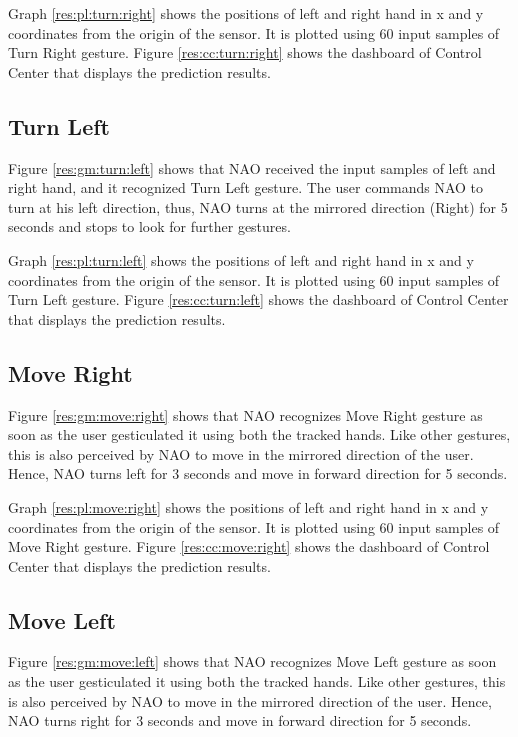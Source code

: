 

Graph \ref{res:pl:turn:right} shows the positions of left and right hand in x and y coordinates from the origin of the sensor. It is plotted using 60 input samples of Turn Right gesture. Figure \ref{res:cc:turn:right} shows the dashboard of Control Center that displays the prediction results. 

\clearpage
\subsection{Turn Left}
 Figure \ref{res:gm:turn:left} shows that NAO received the input samples of left and right hand, and it recognized Turn Left gesture. The user commands NAO to turn at his left direction, thus, NAO turns at the mirrored direction (Right) for 5 seconds and stops to look for further gestures.
 


Graph \ref{res:pl:turn:left} shows the positions of left and right hand in x and y coordinates from the origin of the sensor. It is plotted using 60 input samples of Turn Left gesture. Figure \ref{res:cc:turn:left} shows the dashboard of Control Center that displays the prediction results. 

\clearpage
\subsection{Move Right} 
Figure \ref{res:gm:move:right} shows that NAO recognizes Move Right gesture as soon as the user gesticulated it using both the tracked hands. Like other gestures, this is also perceived by NAO to move in the mirrored direction of the user. Hence, NAO turns left for 3 seconds and move in forward direction for 5 seconds.



Graph \ref{res:pl:move:right} shows the positions of left and right hand in x and y coordinates from the origin of the sensor. It is plotted using 60 input samples of Move Right gesture. Figure \ref{res:cc:move:right} shows the dashboard of Control Center that displays the prediction results. 

\clearpage
\subsection{Move Left}
Figure \ref{res:gm:move:left} shows that NAO recognizes Move Left gesture as soon as the user gesticulated it using both the tracked hands. Like other gestures, this is also perceived by NAO to move in the mirrored direction of the user. Hence, NAO turns right for 3 seconds and move in forward direction for 5 seconds.

